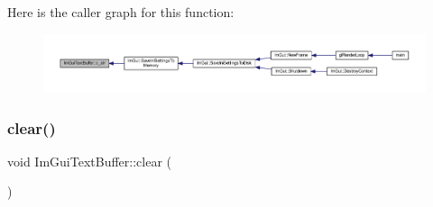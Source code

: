 Here is the caller graph for this function\+:
\nopagebreak
\begin{figure}[H]
\begin{center}
\leavevmode
\includegraphics[width=350pt]{struct_im_gui_text_buffer_afb03439bc91723e274bfb9d247a691b9_icgraph}
\end{center}
\end{figure}
\mbox{\label{struct_im_gui_text_buffer_a9e4edc9f950bc9e35d5c3b3071dbc0df}} 
\subsubsection{\texorpdfstring{clear()}{clear()}}
{\footnotesize\ttfamily void Im\+Gui\+Text\+Buffer\+::clear (\begin{DoxyParamCaption}{ }\end{DoxyParamCaption})\hspace{0.3cm}{\ttfamily [inline]}}


